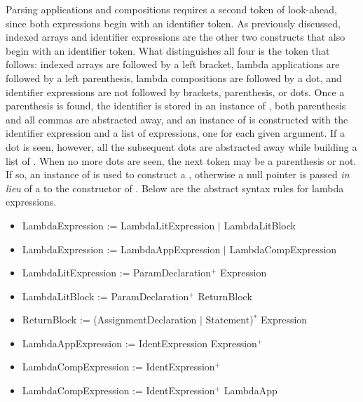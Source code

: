 Parsing applications and compositions requires a second token of look-ahead, since both expressions begin with an identifier token. As previously discussed, indexed arrays and identifier expressions are the other two constructs that also begin with an identifier token. What distinguishes all four is the token that follows: indexed arrays are followed by a left bracket, lambda applications are followed by a left parenthesis, lambda compositions are followed by a dot, and identifier expressions are not followed by brackets, parenthesis, or dots. Once a parenthesis is found, the identifier is stored in an instance of , both parenthesis and all commas are abstracted away, and an instance of  is constructed with the identifier expression and a list of expressions, one for each given argument. If a dot is seen, however, all the subsequent dots are abstracted away while building a list of . When no more dots are seen, the next token may be a parenthesis or not. If so, an instance of  is used to construct a , otherwise a null pointer is passed \emph{in lieu} of a  to the constructor of . Below are the abstract syntax rules for lambda expressions.

\begin{itemize}
	\item LambdaExpression := LambdaLitExpression $|$ LambdaLitBlock
	\item LambdaExpression := LambdaAppExpression $|$ LambdaCompExpression
	\item LambdaLitExpression := ParamDeclaration$^+$ Expression
	\item LambdaLitBlock := ParamDeclaration$^+$ ReturnBlock
	\item ReturnBlock := (AssignmentDeclaration $|$ Statement)$^*$ Expression
	\item LambdaAppExpression := IdentExpression Expression$^+$
	\item LambdaCompExpression := IdentExpression$^+$
	\item LambdaCompExpression := IdentExpression$^+$ LambdaApp
\end{itemize}

